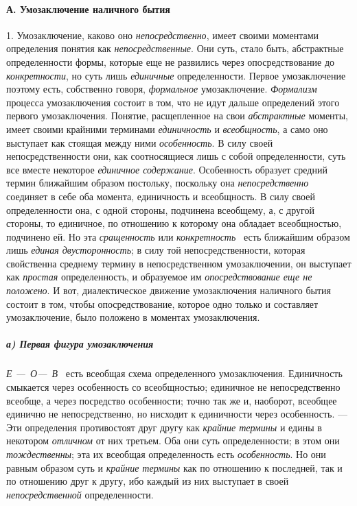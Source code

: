\documentclass[twoside]{article}
\begin{document}
{{{\paragraph[А. Умозаключение наличного бытия]{А. Умозаключение наличного бытия}
1. Умозаключение, каково оно
{\em непосредственно},
имеет своими моментами определения понятия как
{\em непосредственные}.
Они суть, стало быть, абстрактные определенности формы,
которые еще не развились через опосредствование до
{\em конкретности}, но
суть лишь {\em единичные}
определенности. Первое умозаключение поэтому есть,
собственно говоря,
{\em формальное}
умозаключение.
{\em Формализм} процесса
умозаключения состоит в том, что не идут дальше определений этого первого
умозаключения. Понятие, расщепленное на свои
{\em абстрактные}
моменты, имеет своими крайними терминами
{\em единичность} и
{\em всеобщность}, а само
оно выступает как стоящая между ними
{\em особенность}. В силу
своей непосредственности они, как соотносящиеся лишь с собой
определенности, суть все вместе некоторое
{\em единичное содержание}.
Особенность образует средний термин ближайшим образом
постольку, поскольку она
{\em непосредственно}
соединяет в себе оба момента, единичность и всеобщность. В
силу своей определенности она, с одной стороны, подчинена всеобщему, а, с
другой стороны, то единичное, по отношению к которому она обладает
всеобщностью, подчинено ей. Но эта
{\em сращенность} или
{\em конкретность}~\label{bkm:bm48}
есть ближайшим образом лишь
{\em единая двусторонность};
в силу той непосредственности, которая свойственна среднему
термину в непосредственном умозаключении, он выступает как
{\em простая}
определенность, и образуемое им
{\em опосредствование еще не положено}.
И вот, диалектическое движение умозаключения наличного бытия
состоит в том, чтобы опосредствование, которое одно только и составляет
умозаключение, было положено в моментах умозаключения.

\subparagraph[а) Первая фигура умозаключения]{а) Первая фигура умозаключения}
{\em Е —~О—~В}~\label{bkm:bm49}
есть всеобщая схема определенного умозаключения. Единичность
смыкается через особенность со всеобщностью; единичное не непосредственно
всеобще, а через посредство особенности; точно так же и, наоборот, всеобщее
единично не непосредственно, но нисходит к единичности через особенность.
— Эти определения противостоят друг другу как
{\em крайние термины} и
едины в некотором {\em отличном}
от них третьем. Оба они суть определенности; в этом они
{\em тождественны}; эта
их всеобщая определенность есть
{\em особенность}. Но они
равным образом суть и {\em крайние
термины} как по отношению к последней, так и по отношению
друг к другу, ибо каждый из них выступает в своей
{\em непосредственной}
определенности.

}}}
\end{document}
